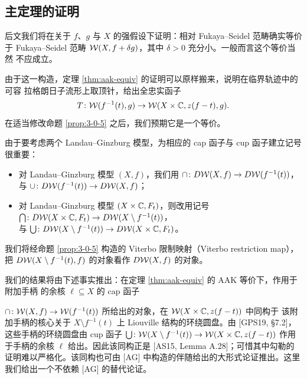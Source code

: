 ﻿%
\subsection{主定理的证明}

后文我们将在关于 $f$、$g$ 与 $X$ 的强假设下证明：相对 Fukaya--Seidel 范畴确实等价于
Fukaya--Seidel 范畴 $\mathcal{W}(X,f+\delta g)$，其中 $\delta>0$ 充分小。一般而言这个等价当然
不应成立。

由于这一构造，定理 \ref{thm:aak-equiv} 的证明可以原样搬来，说明在临界轨迹中的可容
拉格朗日子流形上取顶针，给出全忠实函子
\[
T\colon\mathcal{W}(f^{-1}(t),g)\to\mathcal{W}(X\times\mathbb{C},z(f-t),g).
\]
在适当修改命题 \ref{prop:3-0-5} 之后，我们预期它是一个等价。

由于要考虑两个 Landau--Ginzburg 模型，为相应的 cap 函子与 cup 函子建立记号很重要：

\begin{itemize}
\item 对 Landau--Ginzburg 模型 $(X,f)$，我们用
$\cap\colon D\mathcal{W}(X,f)\to D\mathcal{W}(f^{-1}(t))$，\\
与 $\cup\colon D\mathcal{W}(f^{-1}(t))\to D\mathcal{W}(X,f)$；
\item 对 Landau--Ginzburg 模型 $(X\times\mathbb{C},F_t)$，则改用记号
$\bigcap\colon D\mathcal{W}(X\times\mathbb{C},F_t)\to D\mathcal{W}(X\setminus f^{-1}(t))$，\\
与 $\bigcup\colon D\mathcal{W}(X\setminus f^{-1}(t))\to D\mathcal{W}(X\times\mathbb{C},F_t)$。
\end{itemize}


我们将经命题 \ref{prop:3-0-5} 构造的 Viterbo 限制映射（Viterbo restriction map），把
$D\mathcal{W}(X\setminus f^{-1}(t),f)$ 的对象看作 $D\mathcal{W}(X,f)$ 的对象。

我们的结果将由下述事实推出：在定理 \ref{thm:aak-equiv} 的 AAK 等价下，作用于附加手柄
的余核 $\ell\subseteq X$ 的 cap 函子

$\cap\colon\mathcal{W}(X,f)\to\mathcal{W}(f^{-1}(t))$ 所给出的对象，在 $\mathcal{W}(X\times\mathbb{C},z(f-t))$ 中同构于
该附加手柄的核心关于 $X\setminus f^{-1}(t)$ 上 Liouville 结构的环绕圆盘。由
[GPS19, §7.2]，这些手柄的环绕圆盘由 cup 函子
$\bigcup\colon\mathcal{W}(X\setminus f^{-1}(t))\to\mathcal{W}(X\times\mathbb{C},z(f-t))$ 作用于手柄的余核 $\ell$
给出。因此该同构正是 [AS15, Lemma A.28]；可惜其中勾勒的证明难以严格化。该同构也可由
[AG] 中构造的伴随给出的大形式论证推出。这里我们给出一个不依赖 [AG] 的替代论证。

